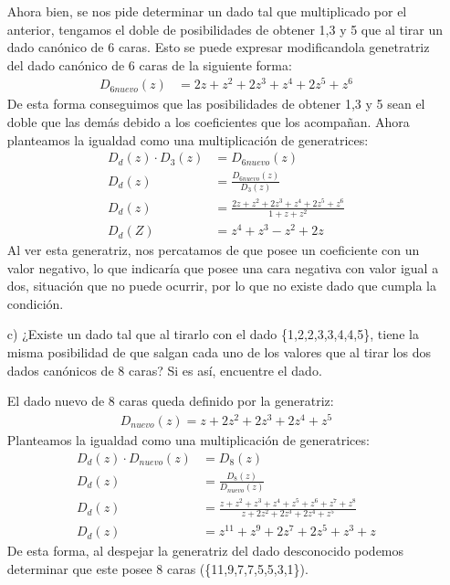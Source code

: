 \documentclass[spanish, fleqn]{article}
\begin{document}
\begin{itemize}
    Ahora bien, se nos pide determinar un dado tal que multiplicado por el anterior, tengamos el doble de posibilidades de obtener 1,3 y 5 que al tirar un dado canónico de 6 caras. Esto se puede expresar modificandola genetratriz del dado canónico de 6 caras de la siguiente forma:
    \begin{align*}
    D_{6nuevo}(z)&=2z+z^2+2z^3+z^4+2z^5+z^6
    \end{align*}
    De esta forma conseguimos que las posibilidades de obtener 1,3 y 5 sean el doble que las demás debido a los coeficientes que los acompañan.
    Ahora planteamos la igualdad como una multiplicación de generatrices:
    \begin{align*}
    D_d(z) \cdot D_3(z)&=D_{6nuevo}(z)\\
    D_d(z) &= \frac{D_{6nuevo}(z)}{D_3(z)}\\
    D_d(z)&= \frac{2z+z^2+2z^3+z^4+2z^5+z^6}{1+z+z^2}    \\
    D_d(Z)&=z^4+z^3-z^2+2z
    \end{align*}
    Al ver esta generatriz, nos percatamos de que posee un coeficiente con un valor negativo, lo que indicaría que posee una cara negativa con valor igual a dos, situación que no puede ocurrir, por lo que no existe dado que cumpla la condición.
    \item[c)] ¿Existe un dado tal que al tirarlo con el dado \{1,2,2,3,3,4,4,5\}, tiene la misma posibilidad de que salgan cada uno de los valores que al tirar los dos dados canónicos de 8 caras? Si es así, encuentre el dado.
    
    El dado nuevo de 8 caras queda definido por la generatriz:
    \begin{align*}
    D_{nuevo}(z)=z+2z^2+2z^3+2z^4+z^5
    \end{align*}
    Planteamos la igualdad como una multiplicación de generatrices:
    \begin{align*}
    D_d(z) \cdot D_{nuevo}(z)&=D_8(z)\\
    D_d(z)&= \frac{D_8(z)}{D_{nuevo}(z)}\\
    D_d(z)&=\frac{z+z^2+z^3+z^4+z^5+z^6+z^7+z^8}{z+2z^2+2z^3+2z^4+z^5}\\
    D_d(z)&=z^11+z^9+2z^7+2z^5+z^3+z
    \end{align*}
    De esta forma, al despejar la generatriz del dado desconocido podemos determinar que este posee 8 caras (\{11,9,7,7,5,5,3,1\}).
	\end{itemize}
\end{document}
